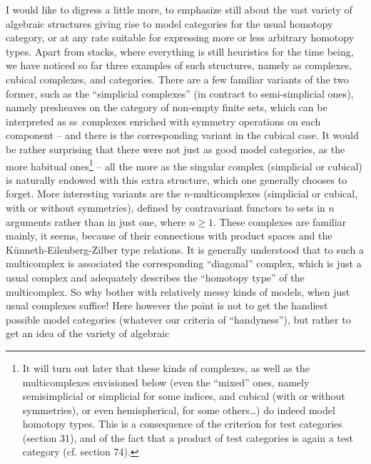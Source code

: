 \label{sec:21}%
I would like to digress a little more, to emphasize still about the
vast variety of algebraic structures giving rise to model categories
for the usual homotopy category, or at any rate suitable for
expressing more or less arbitrary homotopy types. Apart from stacks,
where everything is still heuristics for the time being, we have
noticed so far three examples of such structures, namely as complexes, cubical complexes, and categories. There are a few familiar variants of the two
former, such as the ``simplicial complexes'' (in contract to
semi-simplicial ones), namely presheaves on the category of non-empty
finite sets, which can be interpreted as ss~complexes enriched with
symmetry operations on each component -- and there is the
corresponding variant in the cubical case. It would be rather
surprising that there were not just as good model categories, as the
more habitual ones\footnote{It will turn out later that these kinds of complexes, as well as the multicomplexes envisioned below (even the ``mixed'' ones, namely semisimplicial or simplicial for some indices, and cubical (with or without symmetries), or even hemispherical, for some others\dots) do indeed model homotopy types. This is a consequence of the criterion for test categories (section 31), and of the fact that a product of test categories is again a test category (cf. section 74).} -- all the more as the singular complex (simplicial
or cubical) is naturally endowed with this extra structure, which one
generally chooses to forget. More interesting variants are the
$n$-multicomplexes (simplicial or cubical, with or without
symmetries), defined by contravariant functors to sets in $n$
arguments rather than in just one, where $n\ge1$. These complexes are
familiar mainly, it seems, because of their connections with product
spaces and the K\"unneth-Eilenberg-Zilber type relations. It is
generally understood that to such a multicomplex is
associated the corresponding ``diagonal'' complex, which is
just a usual complex and adequately describes the ``homotopy type'' of
the multicomplex. So why bother with relatively messy kinds of models,
when just usual complexes suffice! Here however the point is not to
get the handiest possible model categories (whatever our criteria of
``handyness''), but rather to get an idea of the variety of algebraic
